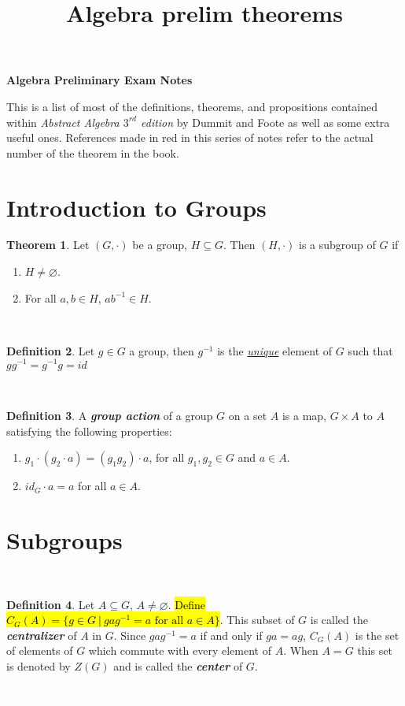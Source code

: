 \documentclass{article}
\title{Algebra prelim theorems}
\theoremstyle{definition}
\newtheorem{thm}{Theorem}[section]
\newtheorem{defn}[thm]{Definition}
\newcommand{\nl}{\textcolor{white}{nothing}}
\newcommand{\seq}{\subseteq}
\newcommand{\es}{\varnothing}
\begin{document}
\begin{center}
\textbf{\Large Algebra Preliminary Exam Notes}
\end{center}

This is a list of most of the definitions, theorems, and propositions contained within \textit{Abstract Algebra $3^{rd}$ edition} by Dummit and Foote as well as some extra useful ones. References made in red in this series of notes refer to the actual number of the theorem in the book.\\

\tableofcontents
\newpage


\section{Introduction to Groups}
\begin{thm}
Let $(G,\cdot)$ be a group, $H\seq G$. Then $(H,\cdot)$ is a subgroup of $G$ if
\begin{enumerate}
\item $H\neq \es$.
\item For all $a,b\in H$, $ab^{-1}\in H$.
\end{enumerate}
\end{thm}

\nl
\begin{defn}
Let $g\in G$ a group, then $g^{-1}$ is the \underline{\textit{unique}} element of $G$ such that $gg^{-1}=g^{-1}g=id$
\end{defn}

\nl
\begin{defn}
A \textbf{\textit{group action}} of a group $G$ on a set $A$ is a map, $G\times A$ to $A$ satisfying the following properties:
\begin{enumerate}
\item $g_1\cdot(g_2\cdot a) = (g_1g_2)\cdot a$, for all $g_1,g_2\in G$ and $a\in A$.
\item $id_G\cdot a = a$ for all $a\in A$.
\end{enumerate}
\end{defn}


\section{Subgroups}

\setcounter{thm}{0}
\nl
\begin{defn}
Let $A\seq G$, $A\neq\es$. \hl{Define $C_G(A) = \{g\in G\ |\ gag^{-1} = a \text{ for all } a\in A\}$}. This subset of $G$ is called the \textbf{\textit{centralizer}} of $A$ in $G$. Since $gag^{-1} = a$ if and only if $ga = ag$, $C_G(A)$ is the set of elements of $G$ which commute with every element of $A$. When $A = G$ this set is denoted by $Z(G)$ and is called the \textit{\textbf{center}} of $G$.
\end{defn}
\nl
\end{document}
